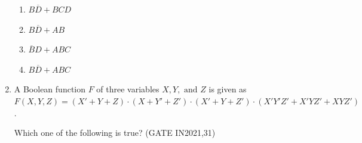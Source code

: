 \begin{enumerate}[label=\arabic*.,ref=\theenumi]
\begin{figure}[H]
\centering

	\caption{}
\label{fig:k-map-E}
\end{figure}

\begin{enumerate}[label=\Alph*.]
\item $B\overline{D} + BCD$
\item $B\overline{D} + AB$
\item $\overline{B}D + ABC$
\item $B\overline{D} + ABC$
\end{enumerate}

\item A Boolean function $F$ of three variables $X, Y, \text{ and } Z$ is given as 
$F(X, Y, Z) = (X' + Y + Z)\cdot(X + Y' + Z') \cdot (X' + Y + Z') \cdot (X'Y'Z' + X' Y Z' + XYZ')$.

Which one of the following is true?
\hfill(GATE IN2021,31)


\end{enumerate}
